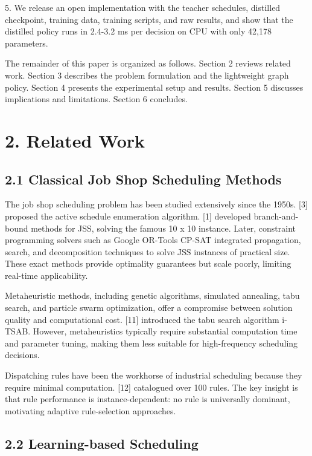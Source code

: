 \documentclass{article}
\begin{document}
5. We release an open implementation with the teacher schedules, distilled checkpoint, training data, training scripts, and raw results, and show that the distilled policy runs in 2.4-3.2 ms per decision on CPU with only 42,178 parameters.

The remainder of this paper is organized as follows. Section 2 reviews related work. Section 3 describes the problem formulation and the lightweight graph policy. Section 4 presents the experimental setup and results. Section 5 discusses implications and limitations. Section 6 concludes.


\section*{2. Related Work}


\subsection*{2.1 Classical Job Shop Scheduling Methods}

The job shop scheduling problem has been studied extensively since the 1950s. {[}3{]} proposed the active schedule enumeration algorithm. {[}1{]} developed branch-and-bound methods for JSS, solving the famous 10 x 10 instance. Later, constraint programming solvers such as Google OR-Tools CP-SAT integrated propagation, search, and decomposition techniques to solve JSS instances of practical size. These exact methods provide optimality guarantees but scale poorly, limiting real-time applicability.

Metaheuristic methods, including genetic algorithms, simulated annealing, tabu search, and particle swarm optimization, offer a compromise between solution quality and computational cost. {[}11{]} introduced the tabu search algorithm i-TSAB. However, metaheuristics typically require substantial computation time and parameter tuning, making them less suitable for high-frequency scheduling decisions.

Dispatching rules have been the workhorse of industrial scheduling because they require minimal computation. {[}12{]} catalogued over 100 rules. The key insight is that rule performance is instance-dependent: no rule is universally dominant, motivating adaptive rule-selection approaches.


\subsection*{2.2 Learning-based Scheduling}
\end{document}
